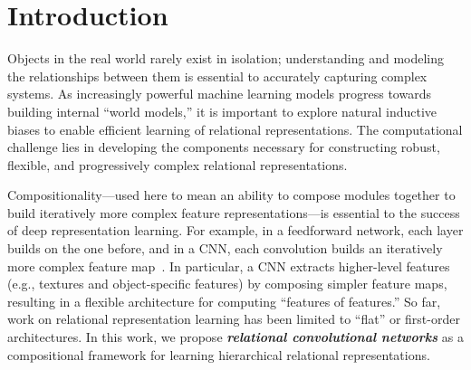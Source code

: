 \section{Introduction}\label{sec:intro}

Objects in the real world rarely exist in isolation; understanding and modeling the relationships between them is essential to accurately capturing complex systems. As increasingly powerful machine learning models progress towards building internal ``world models,'' it is important to explore natural inductive biases to enable efficient learning of relational representations. The computational challenge lies in developing the components necessary for constructing robust, flexible, and progressively complex relational representations.


Compositionality---used here to mean an ability to compose modules together to build iteratively more complex feature representations---is essential to the success of deep representation learning. 
 For example, in a feedforward network, each layer builds on the one before, and in a CNN, each convolution builds an iteratively more complex feature map~\citep{zeiler2014visualizing}. 
In particular, a CNN extracts higher-level features (e.g., textures and object-specific features) by composing simpler feature maps, resulting in a flexible architecture for computing ``features of features.''
So far, work on relational representation learning has been limited to ``flat'' or first-order architectures. In this work, we propose \textit{\bfseries relational convolutional networks} as a compositional framework for learning hierarchical relational representations.

